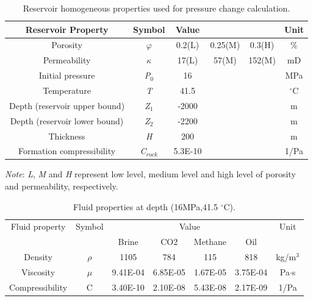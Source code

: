 \clearpage
\begin{table}[h!]
	\begin{center}
		\begin{threeparttable}
			\caption{Reservoir homogeneous properties used for pressure change calculation.}
			\label{tab:table1}
			\begin{tabular}{cccccc}
				\midrule
				Reservoir Property & Symbol & Value & & & Unit\\
				\midrule
				Porosity & $\varphi$ & 0.2(L) & 0.25(M) & 0.3(H) & \%\\
				Permeability & $\kappa$ & 17(L) & 57(M) & 152(M) & mD\\
				Initial pressure & \textit{P$_{0}$} & 16 & & & MPa\\
				Temperature & \textit{T} & 41.5 & & & $^{\circ}$C\\
				Depth (reservoir upper bound) & \textit{Z$_{1}$} & -2000 & & & m\\
				Depth (reservoir lower bound) & \textit{Z$_{2}$} & -2200 & & & m\\
				Thickness & \textit{H} & 200 & & & m\\
				Formation compressibility & \textit{C$_{rock}$} & 5.3E-10 & & & 1/Pa\\
				\midrule
			\end{tabular}
			\begin{tablenotes}
				\small
				\item \textit{Note}: \textit{L}, \textit{M} and \textit{H} represent low level, medium level and high level of porosity and permeability, respectively.
			\end{tablenotes}
		\end{threeparttable}
	\end{center}
\end{table}

\clearpage
\begin{table}[h!]
	\begin{center}
		\caption{Fluid properties at depth (16MPa,41.5 $^{\circ}$C).}
		\label{tab:table2}
		\begin{tabular}{ccccccc}
			\midrule
			Fluid property & Symbol &\multicolumn{4}{c}{Value} & Unit \\
			\cmidrule(l){3-6}
			&& Brine & CO2 & Methane & Oil &\\
			\midrule
			Density & $\rho$ & 1105 & 784 & 115 & 818 & kg/m$^{3}$\\
			Viscosity & $\mu$ & 9.41E-04 & 6.85E-05 & 1.67E-05 & 3.75E-04 & Pa$\cdot$s\\
			Compressibility & C & 3.40E-10 & 2.10E-08 & 5.43E-08 & 2.17E-09 & 1/Pa\\
			\midrule
		\end{tabular}
	\end{center}
\end{table}

